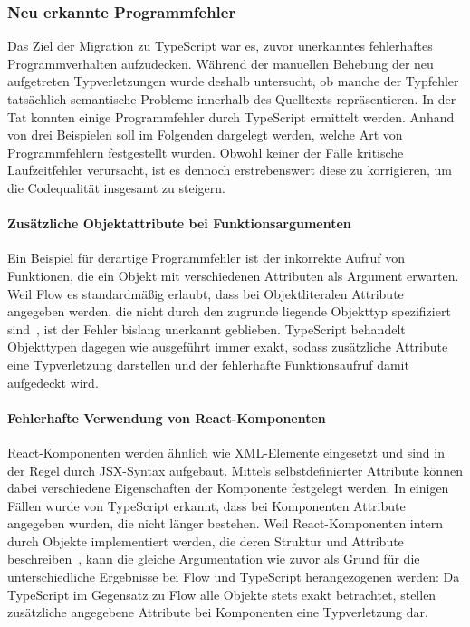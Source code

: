 \subsubsection{Neu erkannte Programmfehler}

Das Ziel der Migration zu TypeScript war es, zuvor unerkanntes fehlerhaftes Programmverhalten aufzudecken. Während der manuellen Behebung der neu aufgetreten Typverletzungen wurde deshalb untersucht, ob manche der Typfehler tatsächlich semantische Probleme innerhalb des Quelltexts repräsentieren. In der Tat konnten einige Programmfehler durch TypeScript ermittelt werden. Anhand von drei Beispielen soll im Folgenden dargelegt werden, welche Art von Programmfehlern festgestellt wurden. Obwohl keiner der Fälle kritische Laufzeitfehler verursacht, ist es dennoch erstrebenswert diese zu korrigieren, um die Codequalität insgesamt zu steigern.

\vspace{-0.5\baselineskip}
\paragraph{Zusätzliche Objektattribute bei Funktionsargumenten}
Ein Beispiel für derartige Programmfehler ist der inkorrekte Aufruf von Funktionen, die ein Objekt mit verschiedenen Attributen als Argument erwarten. Weil Flow es standardmäßig erlaubt, dass bei Objektliteralen Attribute angegeben werden, die nicht durch den zugrunde liegende Objekttyp spezifiziert sind~\autocite{FLOW:WIDTH_SUBTYPING}, ist der Fehler bislang unerkannt geblieben. TypeScript behandelt Objekttypen dagegen wie ausgeführt immer exakt, sodass zusätzliche Attribute eine Typverletzung darstellen und der fehlerhafte Funktionsaufruf damit aufgedeckt wird.

\vspace{-0.5\baselineskip}
\paragraph{Fehlerhafte Verwendung von React-Komponenten}
React-Komponenten werden ähnlich wie XML-Elemente eingesetzt und sind in der Regel durch JSX-Syntax aufgebaut. Mittels selbstdefinierter Attribute können dabei verschiedene Eigenschaften der Komponente festgelegt werden. In einigen Fällen wurde von TypeScript erkannt, dass bei Komponenten Attribute angegeben wurden, die nicht länger bestehen. Weil React-Komponenten intern durch Objekte implementiert werden, die deren Struktur und Attribute beschreiben~\autocite{REACT:REACT_ELEMENTS}, kann die gleiche Argumentation wie zuvor als Grund für die unterschiedliche Ergebnisse bei Flow und TypeScript herangezogenen werden: Da TypeScript im Gegensatz zu Flow alle Objekte stets exakt betrachtet, stellen zusätzliche angegebene Attribute bei Komponenten eine Typverletzung dar.

